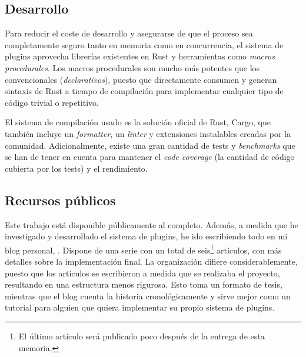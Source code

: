 \subsection{Desarrollo}

Para reducir el coste de desarrollo y asegurarse de que el proceso sea
completamente seguro tanto en memoria como en concurrencia, el sistema de
plugins aprovecha librerías existentes en Rust y herramientas como \emph{macros
procedurales}. Los macros procedurales son mucho más potentes que los
convencionales (\emph{declarativos}), puesto que directamente consumen y generan
sintaxis de Rust a tiempo de compilación para implementar cualquier tipo de
código trivial o repetitivo.

El sistema de compilación usado es la solución oficial de Rust, Cargo, que
también incluye un \emph{formatter}, un \emph{linter} y extensiones instalables
creadas por la comunidad. Adicionalmente, existe una gran cantidad de tests y
\emph{benchmarks} que se han de tener en cuenta para mantener el \emph{code
coverage} (la cantidad de código cubierta por los tests) y el rendimiento.

\subsection{Recursos públicos}

Este trabajo está disponible públicamente al completo. Además, a medida que he
investigado y desarrollado el sistema de plugins, he ido escribiendo todo en mi
blog personal, . Dispone de una serie con un total de
seis\footnote{El último artículo será publicado poco después de la entrega de
esta memoria.} artículos, con más detalles sobre la implementación final. La
organización difiere considerablemente, puesto que los artículos se escribieron
a medida que se realizaba el proyecto, resultando en una estructura menos
rigurosa. Esto toma un formato de tesis, mientras que el blog cuenta la historia
cronológicamente y sirve mejor como un tutorial para alguien que quiera
implementar su propio sistema de plugins.

